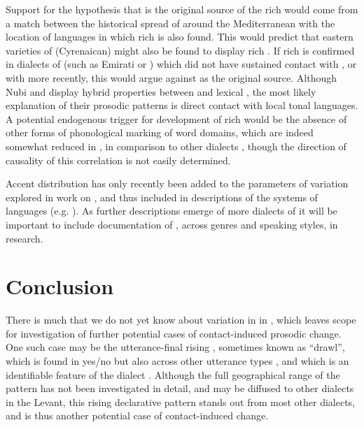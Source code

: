 \documentclass[output=paper]{langsci/langscibook}
\begin{document}
Support for the hypothesis that  is the original source of the rich  would come from a match between the historical spread of  around the Mediterranean with the location of languages in which rich  is also found. This would predict that eastern varieties of  (Cyrenaican)  might also be found to display rich . If rich  is confirmed in dialects of  (such as Emirati or ) which did not have sustained contact with , or with  more recently, this would argue against  as the original source. Although Nubi \citep{Gussenhoven2006} and   \citep{Nakao2013} display hybrid properties between  and lexical , the most likely explanation of their prosodic patterns is direct contact with local tonal languages. A potential endogenous trigger for development of rich  would be the absence of other forms of phonological marking of word domains, which are indeed somewhat reduced in , in comparison to other dialects \citep{Watson2002}, though the direction of causality of this correlation is not easily determined. 

Accent distribution has only recently been added to the parameters of variation explored in work on  \citep{Hellmuth2007}, and thus included in descriptions of the  systems of languages (e.g. \citealt{FrotaPrieto2015}). As further descriptions emerge of more dialects of  it will be important to include documentation of , across genres and speaking styles, in  research.


\section{Conclusion} \label{closes}

There is much that we do not yet know about variation in  in , which leaves scope for investigation of further potential cases of contact-induced prosodic change. One such case may be the   utterance-final rising , sometimes known as ``drawl'', which is found in yes/no  but also across other utterance types \citep{Cowell1964}, and which is an identifiable feature of the  dialect \citep{KulkOdéWoidich2003}. Although the full geographical range of the pattern has not been investigated in detail, and may be diffused to other dialects in the Levant, this rising declarative  pattern stands out from most other  dialects, and is thus another potential case of contact-induced change. 
\end{document}
